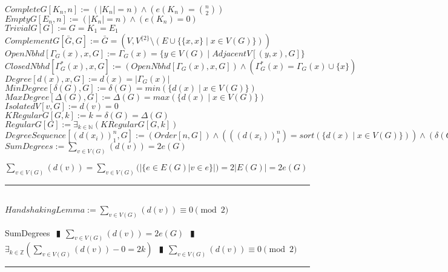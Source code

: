 \documentclass{book}
\newcommand{\abr}{:=}
\newcommand{\pipe}{$\phantom{(}\vrectangleblack\phantom{)}$}
\newcommand{\st}{\mathbin{|}}
\newcommand{\utup}[1]{\{#1\}}
\begin{document}
$CompleteG[K_n, n] \abr (|K_n| = n) \land (e(K_n) = {n \choose 2})$ \\
$EmptyG[E_n, n] \abr (|K_n| = n) \land (e(K_n) = 0)$ \\
$TrivialG[G] \abr G = K_1 = E_1$ \\
$ComplementG[\bar{G}, G] \abr \bar{G} = (V, V^{\{2\}} \setminus (E \cup \{\utup{x, x} \st x \in V(G)\}))$ \\
$OpenNbhd[\Gamma_G(x), x, G] \abr \Gamma_G(x) = \{y \in V(G) \st AdjacentV[(y, x), G]\}$ \\
$ClosedNbhd[\Gamma_G^*(x), x, G] \abr (OpenNbhd[\Gamma_G(x), x, G]) \land (\Gamma_G^*(x) = \Gamma_G(x) \cup \{x\})$ \\
$Degree[d(x), x, G] \abr d(x) = |\Gamma_G(x)|$ \\
$MinDegree[\delta(G), G] \abr \delta(G) = min(\{d(x) \st x \in V(G)\})$ \\
$MaxDegree[\Delta(G), G] \abr \Delta(G) = max(\{d(x) \st x \in V(G)\})$ \\
$IsolatedV[v, G] \abr d(v) = 0$ \\
$KRegularG[G, k] \abr k = \delta(G) = \Delta(G)$ \\
$RegularG[G] \abr \exists_{k \in \mathbb{N}}(KRegularG[G, k])$ \\
$DegreeSequence[(d(x_i))_1^n, G] \abr (Order[n, G]) \land (((d(x_i))_1^n) = sort(\{d(x) \st x \in V(G)\})) \land (\delta(G) = d(x_1) \leq d(x_n) = \Delta(G))$ \\

$SumDegrees \abr \sum \limits_{v \in V(G)}(d(v)) = 2 e(G)$ \\
\begin{enumerate}
  \lit $\sum \limits_{v \in V(G)}(d(v)) = \sum \limits_{v \in V(G)}(|\{e \in E(G) | v \in e\}|) = 2 |E(G)| = 2 e(G)$ \\
\end{enumerate} \vspace{.75mm} \hrule \vspace{.75mm} \ \\

$HandshakingLemma \abr \sum \limits_{v \in V(G)}(d(v)) \equiv 0 \pmod{2}$ \\
\begin{enumerate}
  \lit SumDegrees \pipe $\sum \limits_{v \in V(G)}(d(v)) = 2 e(G)$ \pipe $\exists_{k \in \mathbb{Z}}(\sum \limits_{v \in V(G)}(d(v)) - 0 = 2 k)$ \pipe $\sum \limits_{v \in V(G)}(d(v)) \equiv 0 \pmod{2}$
\end{enumerate} \vspace{.75mm} \hrule \vspace{.75mm} \ \\
\end{document}
